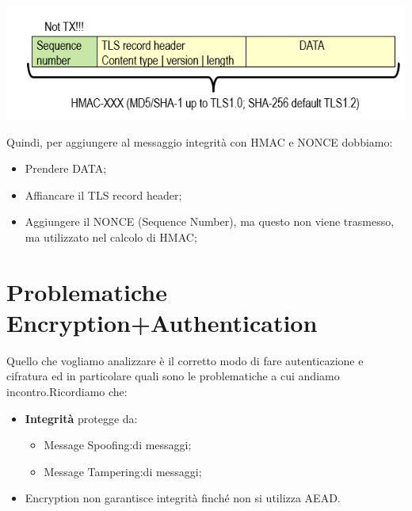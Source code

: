 \documentclass{book}
\theoremstyle{remark}
\begin{document}
\begin{center}
	\includegraphics[scale=0.5]{SEQ2TLS.png}
\end{center}
Quindi, per aggiungere al messaggio integrità con HMAC e NONCE dobbiamo:
\begin{itemize}
	\item Prendere DATA;\@
	\item Affiancare il TLS record header;\@
	\item Aggiungere il NONCE (Sequence Number), ma questo non viene trasmesso, ma utilizzato nel calcolo di HMAC;\@
\end{itemize}
\section{Problematiche Encryption+Authentication}
Quello che vogliamo analizzare è il corretto modo di fare autenticazione e cifratura ed in particolare quali sono le problematiche a cui andiamo incontro\@.Ricordiamo che:\begin{itemize}
	\item \textbf{Integrità} protegge da:
	      \begin{itemize}
		      \item Message Spoofing:\@iniezione di messaggi;\@
		      \item Message Tampering:\@modfica di messaggi;\@
	      \end{itemize}
	\item Encryption non garantisce integrità finché non si utilizza AEAD\@.
\end{itemize}
\end{document}
